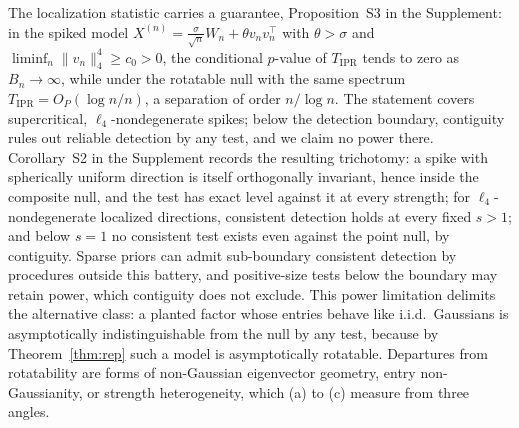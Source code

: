 The localization statistic carries a guarantee, Proposition~S3 in the
Supplement: in the spiked model
$X^{(n)}=\tfrac{\sigma}{\sqrt n}W_n+\theta v_nv_n^\top$ with
$\theta>\sigma$ and $\liminf_n\lVert v_n\rVert_4^4\ge c_0>0$, the
conditional $p$-value of $T_{\mathrm{IPR}}$ tends to zero as
$B_n\to\infty$, while under the rotatable null with the same spectrum
$T_{\mathrm{IPR}}=O_P(\log n/n)$, a separation of order $n/\log n$.
The statement covers supercritical, $\ell_4$-nondegenerate spikes;
below the detection boundary, contiguity
\citep{onatski2013asymptotic,perry2018optimality} rules out reliable
detection by any test, and we claim no power there. Corollary~S2 in the Supplement records the resulting trichotomy: a
spike with spherically uniform direction is itself orthogonally
invariant, hence inside the composite null, and the test has exact
level against it at every strength; for $\ell_4$-nondegenerate
localized directions, consistent detection holds at every fixed $s>1$;
and below $s=1$ no consistent test exists even against the point null,
by contiguity. Sparse priors can admit sub-boundary consistent
detection by procedures outside this battery, and positive-size tests
below the boundary may retain power, which contiguity does not
exclude.
This power limitation delimits the alternative class: a planted factor whose entries behave like i.i.d.\
Gaussians is asymptotically indistinguishable from the null by any test,
because by Theorem~\ref{thm:rep} such a model is asymptotically rotatable.
Departures from rotatability are forms of non-Gaussian eigenvector
geometry, entry non-Gaussianity, or strength heterogeneity, which (a) to
(c) measure from three angles.

